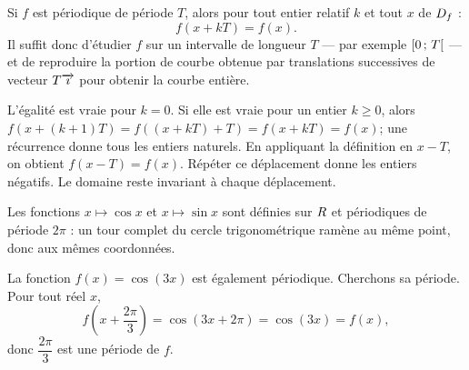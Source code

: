 \begin{propriete}
Si $f$ est périodique de période $T$, alors pour tout entier relatif $k$ et
tout $x$ de $D_{f}$ :
\[
  f(x + kT) = f(x).
\]
Il suffit donc d'étudier $f$ sur un intervalle de longueur $T$ — par exemple
$\left[0\,;\,T\right[$ — et de reproduire la portion de courbe obtenue par
translations successives de vecteur $T\overrightarrow{\imath}$ pour obtenir la courbe entière.
\end{propriete}

\begin{demonstration}
L’égalité est vraie pour $k=0$. Si elle est vraie pour un entier $k\ge0$, alors
$f(x+(k+1)T)=f((x+kT)+T)=f(x+kT)=f(x)$; une récurrence donne tous les entiers naturels.
En appliquant la définition en $x-T$, on obtient $f(x-T)=f(x)$. Répéter ce déplacement donne les entiers négatifs. Le domaine reste invariant à chaque déplacement.
\end{demonstration}

\begin{exemple}
Les fonctions $x \mapsto \cos x$ et $x \mapsto \sin x$ sont définies sur $R$
et périodiques de période $2\pi$ : un tour complet du cercle
trigonométrique ramène au même point, donc aux mêmes coordonnées.

La fonction $f(x) = \cos(3x)$ est également périodique. Cherchons sa période.
Pour tout réel $x$,
\[
  f\!\left(x + \frac{2\pi}{3}\right)
  = \cos\!\left(3x + 2\pi\right) = \cos(3x) = f(x),
\]
donc $\dfrac{2\pi}{3}$ est une période de $f$.
\end{exemple}

